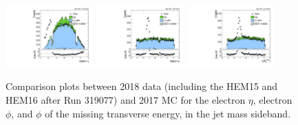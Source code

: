 \begin{figure}[htbp]
  \centering
  \includegraphics[width=0.30\textwidth]{fig/controlPlots/SB_e_2018_lnujj_l1_l_eta.pdf}
  \includegraphics[width=0.30\textwidth]{fig/controlPlots/SB_e_2018_lnujj_l1_l_phi.pdf}
  \includegraphics[width=0.30\textwidth]{fig/controlPlots/SB_e_2018_met_phi.pdf}
  \caption{
    Comparison plots between 2018 data (including the HEM15 and HEM16 after Run 319077) and 2017 MC for the electron $\eta$, electron $\phi$, and $\phi$ of the missing transverse energy, in the jet mass sideband.
  }
  \label{fig:SB_controlPlots2018_electronexcess}
\end{figure}


